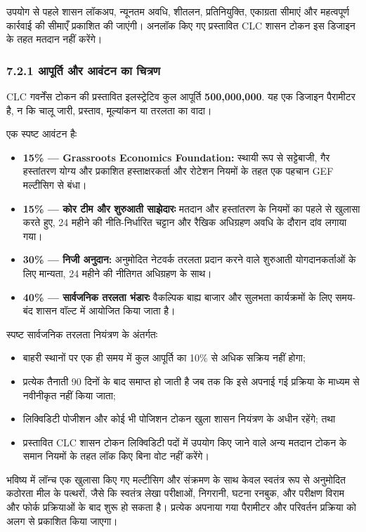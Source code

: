 \documentclass[11pt]{article}
\begin{document}
उपयोग से पहले शासन लॉकअप, न्यूनतम अवधि, शीतलन, प्रतिनियुक्ति, एकाग्रता सीमाएं और महत्वपूर्ण कार्रवाई की सीमाएँ प्रकाशित की जाएंगी। अनलॉक किए गए प्रस्तावित CLC शासन टोकन इस डिजाइन के तहत मतदान नहीं करेंगे।

\subsubsection*{7.2.1 आपूर्ति और आवंटन का चित्रण}

CLC गवर्नेंस टोकन की प्रस्तावित इलस्ट्रेटिव कुल आपूर्ति \textbf{500,000,000}. यह एक डिजाइन पैरामीटर है, न कि चालू जारी, प्रस्ताव, मूल्यांकन या तरलता का वादा।

एक स्पष्ट आवंटन हैः

\begin{itemize}[leftmargin=*]
\item \textbf{15\% --- Grassroots Economics Foundation:} स्थायी रूप से सट्टेबाजी, गैर हस्तांतरण योग्य और प्रकाशित हस्ताक्षरकर्ता और रोटेशन नियमों के तहत एक पहचान GEF मल्टीसिग से बंधा।
\item \textbf{15\% --- कोर टीम और शुरुआती साझेदारः} मतदान और हस्तांतरण के नियमों का पहले से खुलासा करते हुए, 24 महीने की नीति-निर्धारित चट्टान और रैखिक अधिग्रहण अवधि के दौरान दांव लगाया गया।
\item \textbf{30\% --- निजी अनुदान:} अनुमोदित नेटवर्क तरलता प्रदान करने वाले शुरुआती योगदानकर्ताओं के लिए मान्यता, 24 महीने की नीतिगत अधिग्रहण के साथ।
\item \textbf{40\% --- सार्वजनिक तरलता भंडारः} वैकल्पिक बाह्य बाजार और सुलभता कार्यक्रमों के लिए समय-बंद शासन वॉल्ट में आयोजित किया जाता है।
\end{itemize}
स्पष्ट सार्वजनिक तरलता नियंत्रण के अंतर्गतः

\begin{itemize}[leftmargin=*]
\item बाहरी स्थानों पर एक ही समय में कुल आपूर्ति का 10\% से अधिक सक्रिय नहीं होगा;
\item प्रत्येक तैनाती 90 दिनों के बाद समाप्त हो जाती है जब तक कि इसे अपनाई गई प्रक्रिया के माध्यम से नवीनीकृत नहीं किया जाता;
\item लिक्विडिटी पोजीशन और कोई भी पोजिशन टोकन खुला शासन नियंत्रण के अधीन रहेंगे; तथा
\item प्रस्तावित CLC शासन टोकन लिक्विडिटी पदों में उपयोग किए जाने वाले अन्य मतदान टोकन के समान नियमों के तहत लॉक किए बिना वोट नहीं करेंगे।
\end{itemize}
भविष्य में लॉन्च एक खुलासा किए गए मल्टीसिग और संक्रमण के साथ केवल स्वतंत्र रूप से अनुमोदित कठोरता मील के पत्थरों, जैसे कि स्वतंत्र लेखा परीक्षाओं, निगरानी, घटना रनबुक, और परीक्षण विराम और फोर्क प्रक्रियाओं के बाद शुरू हो सकता है। प्रत्येक अपनाया गया पैरामीटर और परिवर्तन प्रक्रिया को अलग से प्रकाशित किया जाएगा।
\end{document}
